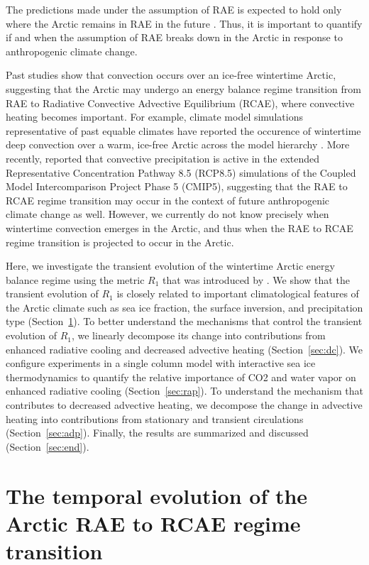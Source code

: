 \documentclass[draft]{agujournal2019}
\begin{document}
The predictions made under the assumption of RAE is expected to hold only where the Arctic remains in RAE in the future \cite{miyawaki2022}. Thus, it is important to quantify if and when the assumption of RAE breaks down in the Arctic in response to anthropogenic climate change.

Past studies show that convection occurs over an ice-free wintertime Arctic, suggesting that the Arctic may undergo an energy balance regime transition from RAE to Radiative Convective Advective Equilibrium (RCAE), where convective heating becomes important. For example, climate model simulations representative of past equable climates have reported the occurence of wintertime deep convection over a warm, ice-free Arctic across the model hierarchy \cite{huber1999, abbot2008, abbot2008a, abbot2009, arnold2014}. More recently,  reported that convective precipitation is active in the extended Representative Concentration Pathway 8.5 (RCP8.5) simulations of the Coupled Model Intercomparison Project Phase 5 (CMIP5), suggesting that the RAE to RCAE regime transition may occur in the context of future anthropogenic climate change as well. However, we currently do not know precisely when wintertime convection emerges in the Arctic, and thus when the RAE to RCAE regime transition is projected to occur in the Arctic.

Here, we investigate the transient evolution of the wintertime Arctic energy balance regime using the metric $R_1$ that was introduced by . We show that the transient evolution of $R_1$ is closely related to important climatological features of the Arctic climate such as sea ice fraction, the surface inversion, and precipitation type (Section~\ref{sec:r1}). To better understand the mechanisms that control the transient evolution of $R_1$, we linearly decompose its change into contributions from enhanced radiative cooling and decreased advective heating (Section~\ref{sec:dc}). We configure experiments in a single column model with interactive sea ice thermodynamics to quantify the relative importance of CO2 and water vapor on enhanced radiative cooling (Section~\ref{sec:rap}). To understand the mechanism that contributes to decreased advective heating, we decompose the change in advective heating into contributions from stationary and transient circulations (Section~\ref{sec:adp}). Finally, the results are summarized and discussed (Section~\ref{sec:end}).

\section{The temporal evolution of the Arctic RAE to RCAE regime transition}
\label{sec:r1}
\end{document}

